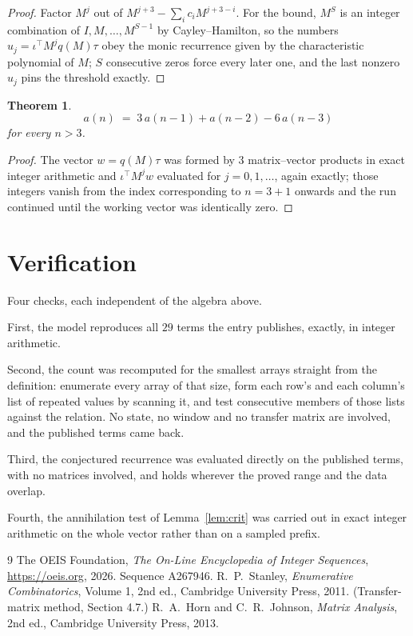 \documentclass[11pt,a4paper]{article}
\theoremstyle{plain}
\newtheorem{theorem}{Theorem}
\theoremstyle{definition}
\begin{document}
\begin{proof}
Factor $M^{j}$ out of $M^{j+3}-\sum_ic_iM^{j+3-i}$. For the bound, $M^{S}$
is an integer combination of $I,M,\dots,M^{S-1}$ by Cayley--Hamilton, so the numbers
$u_j=\iota^{\!\top}M^{j}q(M)\tau$ obey the monic recurrence given by the characteristic
polynomial of $M$; $S$ consecutive zeros force every later one, and the last nonzero $u_j$
pins the threshold exactly.
\end{proof}

\begin{theorem}
\[
a(n)\;=\;3\,a(n-1) + a(n-2) - 6\,a(n-3)
\]
for every $n>3$.
\end{theorem}

\begin{proof}
The vector $w=q(M)\tau$ was formed by $3$ matrix--vector products in exact integer
arithmetic and $\iota^{\!\top}M^{j}w$ evaluated for $j=0,1,\dots$, again exactly; those
integers vanish from the index corresponding to $n=3+1$ onwards and the run continued
until the working vector was identically zero.
\end{proof}

\section{Verification}

Four checks, each independent of the algebra above.

First, the model reproduces all $29$ terms the entry publishes, exactly, in integer
arithmetic.

Second, the count was recomputed for the smallest arrays straight from the definition:
enumerate every array of that size, form each row's and each column's list of repeated values
by scanning it, and test consecutive members of those lists against the relation. No state, no
window and no transfer matrix are involved, and the published terms came back.

Third, the conjectured recurrence was evaluated directly on the published terms, with no
matrices involved, and holds wherever the proved range and the data overlap.

Fourth, the annihilation test of Lemma~\ref{lem:crit} was carried out in exact integer
arithmetic on the whole vector rather than on a sampled prefix.

\begin{thebibliography}{9}
 The OEIS Foundation, \emph{The On-Line Encyclopedia of Integer
Sequences}, \url{https://oeis.org}, 2026. Sequence A267946.
 R.~P.~Stanley, \emph{Enumerative Combinatorics}, Volume 1, 2nd ed.,
Cambridge University Press, 2011. (Transfer-matrix method, Section 4.7.)
 R.~A.~Horn and C.~R.~Johnson, \emph{Matrix Analysis}, 2nd ed., Cambridge
University Press, 2013.
\end{thebibliography}
\end{document}
